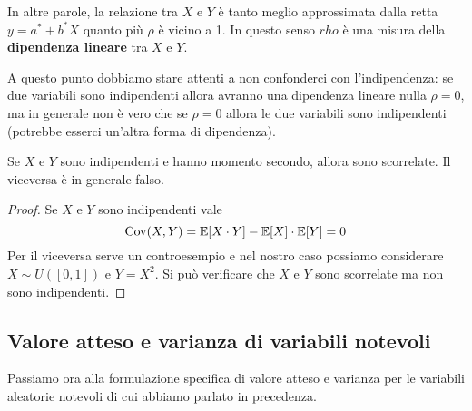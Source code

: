 In altre parole, la relazione tra $X$ e $Y$ è tanto meglio approssimata dalla retta $y=a^*+b^*X$
quanto più $\rho$ è vicino a 1. In questo senso $rho$ è una misura della \textbf{dipendenza lineare}
tra $X$ e $Y$.

A questo punto dobbiamo stare attenti a non confonderci con l'indipendenza: se due variabili sono
indipendenti allora avranno una dipendenza lineare nulla $\rho=0$, ma in generale non è vero che
se $\rho=0$ allora le due variabili sono indipendenti (potrebbe esserci un'altra forma di
dipendenza).

\begin{proposition}
	Se $X$ e $Y$ sono indipendenti e hanno momento secondo, allora sono scorrelate. Il viceversa è
	in generale falso.
	\begin{proof}
		Se $X$ e $Y$ sono indipendenti vale
		\[ \operatorname{Cov}(X,Y) = \mathbb{E}[X \cdot Y] - \mathbb{E}[X] \cdot \mathbb{E}[Y] = 0 \]
		Per il viceversa serve un controesempio e nel nostro caso possiamo considerare
		$X \sim U([0,1])$ e $Y = X^2$. Si può verificare che $X$ e $Y$ sono scorrelate ma non sono
		indipendenti.
	\end{proof}
\end{proposition}

\subsection{Valore atteso e varianza di variabili notevoli}
Passiamo ora alla formulazione specifica di valore atteso e varianza per le variabili aleatorie
notevoli di cui abbiamo parlato in precedenza.

